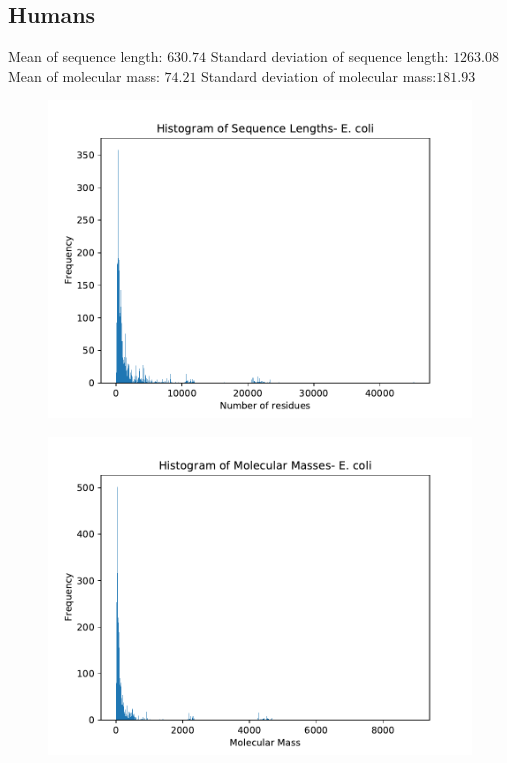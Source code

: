 \documentclass[a4paper]{article}
\begin{document}
\subsection{Humans}
Mean of sequence length: $630.74$ \newline
Standard deviation of sequence length: $1263.08$ \newline
Mean of molecular mass: $74.21$ \newline
Standard deviation of molecular mass:$181.93$ \newline
\begin{figure}
    \includegraphics{ecoli_length.pdf}
\centering 
\end{figure} 
\begin{figure}
    \includegraphics{ecoli_mass.pdf}
\centering 
\end{figure} 
\end{document}
